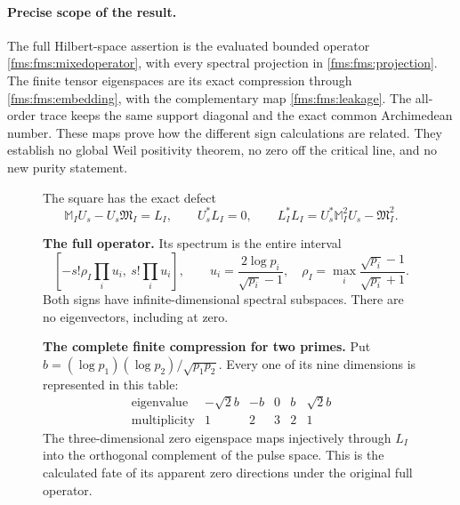 \documentclass[11pt,a4paper]{article}
\theoremstyle{definition}\newtheorem{definition}[theorem]{Definition}
\newcommand{\C}{\mathbb C}\newcommand{\R}{\mathbb R}
\begin{document}
\paragraph{Precise scope of the result.}
The full Hilbert-space assertion is the evaluated bounded operator
\eqref{fms:fms:mixedoperator}, with every spectral projection in
\eqref{fms:fms:projection}. The finite tensor eigenspaces are its exact
compression through \eqref{fms:fms:embedding}, with the complementary
map \eqref{fms:fms:leakage}. The all-order trace keeps the same support
diagonal and the exact common Archimedean number. These maps prove
how the different sign calculations are related. They establish no
global Weil positivity theorem, no zero off the critical line, and
no new purity statement.


\begin{figure}[p]
\centering
{}

\medskip
The square has the exact defect
\[
 \mathbb M_IU_s-U_s\mathfrak M_I=L_I,
 \qquad U_s^*L_I=0,
 \qquad L_I^*L_I=U_s^*\mathbb M_I^2U_s-\mathfrak M_I^2.
\]

\begin{minipage}{0.92\linewidth}
\textbf{The full operator.}
Its spectrum is the entire interval
\[
 [-s!\rho_I\prod_i u_i,\ s!\prod_i u_i],
 \qquad u_i=\frac{2\log p_i}{\sqrt{p_i}-1},\quad
 \rho_I=\max_i\frac{\sqrt{p_i}-1}{\sqrt{p_i}+1}.
\]
Both signs have infinite-dimensional spectral subspaces. There are
no eigenvectors, including at zero.

\medskip
\textbf{The complete finite compression for two primes.}
Put $b=(\log p_1)(\log p_2)/\sqrt{p_1p_2}$. Every one of
its nine dimensions is represented in this table:
\[
\begin{array}{c|rrrrr}
 \text{eigenvalue}&-\sqrt2b&-b&0&b&\sqrt2b\\\hline
 \text{multiplicity}&1&2&3&2&1
\end{array}
\]
The three-dimensional zero eigenspace maps injectively through
$L_I$ into the orthogonal complement of the pulse space. This is
the calculated fate of its apparent zero directions under the
original full operator.


\end{minipage}
\end{figure}
\end{document}
